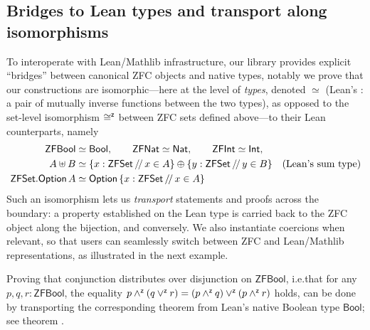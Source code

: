 \subsection{Bridges to Lean types and transport along isomorphisms}
To interoperate with Lean/Mathlib infrastructure, our library provides explicit ``bridges'' between canonical ZFC objects and native types, notably we prove that our constructions are isomorphic---here at the level of \emph{types}, denoted $\simeq$ (Lean's : a pair of mutually inverse functions between the two types), as opposed to the set-level isomorphism $\mathbin{\mathsf{\cong}^{\mathsf{z}}}$ between ZFC sets defined above---to their Lean counterparts, namely
\begin{align*}
  \mathsf{ZFBool}           & \simeq \mathsf{Bool}, \qquad \mathsf{ZFNat} \simeq \mathsf{Nat}, \qquad \mathsf{ZFInt} \simeq \mathsf{Int}, \\
  A \uplus B                & \simeq
  \{ x : \mathsf{ZFSet} \,\slash\mkern-3mu\slash\, x \in A \} \oplus
  \{ y : \mathsf{ZFSet} \,\slash\mkern-3mu\slash\, y \in B \} \quad \text{(Lean's sum type)}                                              \\
  \mathsf{ZFSet.Option}\, A & \simeq \mathsf{Option}\,
  \{ x : \mathsf{ZFSet} \,\slash\mkern-3mu\slash\, x \in A \}
\end{align*}
Such an isomorphism lets us \emph{transport} statements and proofs across the boundary: a property established on the Lean type is carried back to the ZFC object along the bijection, and conversely.
We also instantiate coercions when relevant, so that users can seamlessly switch between ZFC and Lean/Mathlib representations, as illustrated in the next example.
\begin{example}
  Proving that conjunction distributes over disjunction on $\mathsf{ZFBool}$, i.e.\@ that for any $p,q,r : \mathsf{ZFBool}$, the equality $p \mathbin{\mathsf{\land}^{\mathsf{z}}} (q \mathbin{\mathsf{\lor}^{\mathsf{z}}} r) = (p \mathbin{\mathsf{\land}^{\mathsf{z}}} q) \mathbin{\mathsf{\lor}^{\mathsf{z}}} (p \mathbin{\mathsf{\land}^{\mathsf{z}}} r)$ holds, can be done by transporting the corresponding theorem from Lean's native Boolean type $\mathsf{Bool}$; see theorem {\small{}}.
\end{example}
